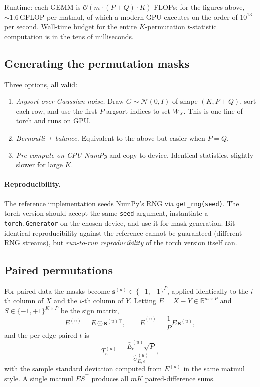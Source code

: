 \documentclass[11pt]{article}
\begin{document}
Runtime: each GEMM is $\mathcal{O}(m \cdot (P+Q) \cdot K)$ FLOPs; for the figures above, $\sim 1.6$\,GFLOP per matmul, of which a modern GPU executes on the order of $10^{13}$ per second. Wall-time budget for the entire $K$-permutation $t$-statistic computation is in the tens of milliseconds.

\subsection{Generating the permutation masks}

Three options, all valid:

\begin{enumerate}[leftmargin=2.0em]
\item \emph{Argsort over Gaussian noise.} Draw $G \sim \mathcal{N}(0, I)$ of shape $(K, P+Q)$, sort each row, and use the first $P$ argsort indices to set $W_X$. This is one line of torch and runs on GPU.
\item \emph{Bernoulli + balance.} Equivalent to the above but easier when $P=Q$.
\item \emph{Pre-compute on CPU NumPy} and copy to device. Identical statistics, slightly slower for large $K$.
\end{enumerate}

\paragraph{Reproducibility.} The reference implementation seeds NumPy's RNG via \texttt{get\_rng(seed)}. The torch version should accept the same \texttt{seed} argument, instantiate a \texttt{torch.Generator} on the chosen device, and use it for mask generation. Bit-identical reproducibility against the reference cannot be guaranteed (different RNG streams), but \emph{run-to-run reproducibility} of the torch version itself can.

\subsection{Paired permutations}

For paired data the masks become $\mathbf{s}^{(u)} \in \{-1, +1\}^P$, applied identically to the $i$-th column of $X$ and the $i$-th column of $Y$. Letting $E = X - Y \in \mathbb{R}^{m\times P}$ and $S \in \{-1, +1\}^{K\times P}$ be the sign matrix,
%
\[
E^{(u)} = E \odot \mathbf{s}^{(u)\top}, \qquad \bar E^{(u)} = \frac{1}{P} E\,\mathbf{s}^{(u)},
\]
%
and the per-edge paired $t$ is
%
\[
T^{(u)}_e = \frac{\bar E^{(u)}_e \sqrt{P}}{\hat\sigma^{(u)}_{E,e}},
\]
%
with the sample standard deviation computed from $E^{(u)}$ in the same matmul style. A single matmul $E S^\top$ produces all $mK$ paired-difference sums.
\end{document}

